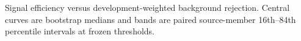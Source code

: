 Signal efficiency versus development-weighted background rejection. Central curves are bootstrap medians and bands are paired source-member 16th--84th percentile intervals at frozen thresholds.
